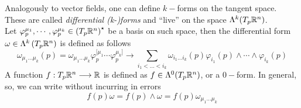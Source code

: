 \documentclass[../complete.tex]{subfiles}
\begin{document}
\begin{dfn}
	Analogously to vector fields, one can define $k-$forms on the tangent space. These are called \textit{differential (k-)forms} and ``live'' on the space $\Lambda^k(T_p\mathbb{R}^n)$.\\
	Let $\varphi^{\mu_1}_p,\cdots,\varphi^{\mu_k}_p\in\left(T_p\mathbb{R}^n\right)^{\star}$ be a basis on such space, then the differential form $\omega\in\Lambda^k\left( T_p\mathbb{R}^n \right)$ is defined as follows
	\begin{equation}
		\omega_{\mu_1\ldots\mu_k}(p)=\omega_{\mu_1\ldots\mu_k}\varphi^{[\mu_1}_p\cdots\varphi^{\mu_k]}_p\to\sum_{i_1<\ldots<i_k}\omega_{i_1\ldots i_k}(p)\varphi_{i_1}(p)\wedge\cdots\wedge\varphi_{i_k}(p)
		\label{eq:differentialformdef}
	\end{equation}
	A function $f:T_p\mathbb{R}^n\overset{}{\longrightarrow}\mathbb{R}$ is defined as $f\in\Lambda^0(T_p\mathbb{R}^n)$, or a $0-$form. In general, so, we can write without incurring in errors
	\begin{equation}
		f(p)\omega=f(p)\wedge\omega=f(p)\omega_{\mu_1\ldots\mu_k}
		\label{eq:funcdifform}
	\end{equation}
\end{dfn}
\end{document}
